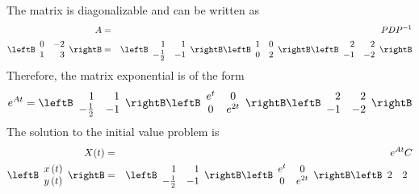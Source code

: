 \begin{solution}
The matrix is diagonalizable and can be written as  
\begin{eqnarray*}
A &=& PDP^{-1} \\
\leftB  
\begin{array}{rr}
0 & -2 \\ 
1 & 3
\end{array}
\rightB &=&\leftB  
\begin{array}{rr}
1 & 1 \\ 
-\frac{1}{2} & -1
\end{array}
\rightB \leftB 
\begin{array}{rr}
1 & 0 \\ 
0 & 2
\end{array}
\rightB \leftB 
\begin{array}{rr}
2 & 2 \\ 
-1 & -2
\end{array}
\rightB
\end{eqnarray*}
Therefore, the matrix exponential is of the form 
\begin{equation*}
e^{At} = \leftB  
\begin{array}{rr}
1 & 1 \\ 
-\frac{1}{2} & -1
\end{array}
\rightB \leftB 
\begin{array}{cc}
e^{t} & 0 \\ 
0 & e^{2t}
\end{array}
\rightB \leftB 
\begin{array}{rr}
2 & 2 \\ 
-1 & -2
\end{array}
\rightB
\end{equation*}
The solution to the initial value problem is
\begin{eqnarray*}
X(t) &=& e^{At}C \\
\leftB 
\begin{array}{c}
x\left( t\right) \\ 
y\left( t\right)
\end{array}
\rightB &=& \leftB  
\begin{array}{rr}
1 & 1 \\ 
-\frac{1}{2} & -1
\end{array}
\rightB \leftB 
\begin{array}{cc}
e^{t} & 0 \\ 
0 & e^{2t}
\end{array}
\rightB \leftB 
\begin{array}{rr}
2 & 2 \\ 

\end{array}
\end{eqnarray*}
\end{solution}
